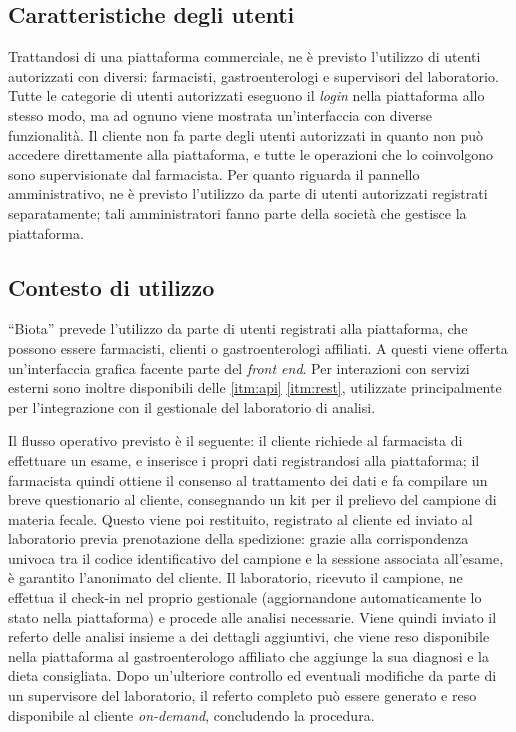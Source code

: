 \subsection{Caratteristiche degli utenti}
Trattandosi di una piattaforma commerciale, ne è previsto l'utilizzo di utenti autorizzati con diversi: farmacisti, gastroenterologi e supervisori del laboratorio. Tutte le categorie di utenti autorizzati eseguono il \textit{login} nella piattaforma allo stesso modo, ma ad ognuno viene mostrata un'interfaccia con diverse funzionalità. Il cliente non fa parte degli utenti autorizzati in quanto non può accedere direttamente alla piattaforma, e tutte le operazioni che lo coinvolgono sono supervisionate dal farmacista.
Per quanto riguarda il pannello amministrativo, ne è previsto l'utilizzo da parte di utenti autorizzati registrati separatamente; tali amministratori fanno parte della società che gestisce la piattaforma.

\subsection{Contesto di utilizzo}
``Biota'' prevede l'utilizzo da parte di utenti registrati alla piattaforma, che possono essere farmacisti, clienti o gastroenterologi affiliati. A questi viene offerta un'interfaccia grafica facente parte del \textit{front end}. Per interazioni con servizi esterni sono inoltre disponibili delle \ref{itm:api} \ref{itm:rest}, utilizzate principalmente per l'integrazione con il gestionale del laboratorio di analisi. 

Il flusso operativo previsto è il seguente: il cliente richiede al farmacista di effettuare un esame, e inserisce i propri dati registrandosi alla piattaforma; il farmacista quindi ottiene il consenso al trattamento dei dati e fa compilare un breve questionario al cliente, consegnando un kit per il prelievo del campione di materia fecale. Questo viene poi restituito, registrato al cliente ed inviato al laboratorio previa prenotazione della spedizione: grazie alla corrispondenza univoca tra il codice identificativo del campione e la sessione associata all'esame, è garantito l'anonimato del cliente. Il laboratorio, ricevuto il campione, ne effettua il check-in nel proprio gestionale (aggiornandone automaticamente lo stato nella piattaforma) e procede alle analisi necessarie. Viene quindi inviato il referto delle analisi insieme a dei dettagli aggiuntivi, che viene reso disponibile nella piattaforma al gastroenterologo affiliato che aggiunge la sua diagnosi e la dieta consigliata. Dopo un'ulteriore controllo ed eventuali modifiche da parte di un supervisore del laboratorio, il referto completo può essere generato e reso disponibile al cliente \textit{on-demand}, concludendo la procedura.

